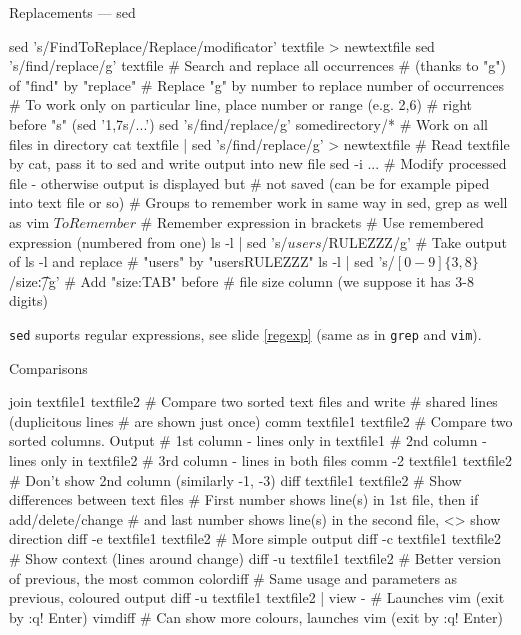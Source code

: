 \documentclass[hyperref={bookmarks=true, unicode=true, colorlinks=true, pdftitle={Linux, command line and MetaCentrum}, plainpages=false, pdfauthor={Vojtech Zeisek}, pdfsubject={Course about use of Linux command line, writing shell scripts and using MetaCentrum of CESNET}, pdfcreator={XeLaTeX, http://www.xelatex.org/}, pdfkeywords={Linux, GNU, BASH, shell, command line, MetaCentrum}, linkcolor=Sienna, anchorcolor=black, citecolor=green, filecolor=magenta, menucolor=Sienna, urlcolor=cyan, pdftex}, compress, ucs, xelatex, xcolor=svgnames, 11pt]{beamer}
\begin{document}
\begin{frame}[fragile]{Replacements --- sed}
  \begin{bashcode}
    sed 's/FindToReplace/Replace/modificator' textfile > newtextfile
    sed 's/find/replace/g' textfile # Search and replace all occurrences
                                    # (thanks to "g") of "find" by "replace"
    # Replace "g" by number to replace number of occurrences
    # To work only on particular line, place number or range (e.g. 2,6)
    # right before "s" (sed '1,7s/...')
    sed 's/find/replace/g' somedirectory/* # Work on all files in directory
    cat textfile | sed 's/find/replace/g' > newtextfile
      # Read textfile by cat, pass it to sed and write output into new file
    sed -i ... # Modify processed file - otherwise output is displayed but
               # not saved (can be for example piped into text file or so)
    # Groups to remember work in same way in sed, grep as well as vim
    \(ToRemember\) # Remember expression in brackets
    \Number # Use remembered expression (numbered from one)
    ls -l | sed 's/\(users\)/\1RULEZZZ/g' # Take output of ls -l and replace
                                          # "users" by "usersRULEZZZ"
    ls -l | sed 's/\([0-9]\{3,8\}\)/size:\t\1/g' # Add "size:TAB" before
                       # file size column (we suppose it has 3-8 digits)
  \end{bashcode}
\texttt{sed} suports regular expressions, see slide \ref{regexp} (same as in \texttt{grep} and \texttt{vim}).
\end{frame}

\begin{frame}[fragile]{Comparisons}
  \begin{bashcode}
    join textfile1 textfile2 # Compare two sorted text files and write
                             # shared lines (duplicitous lines 
                             # are shown just once)
    comm textfile1 textfile2 # Compare two sorted columns. Output
      # 1st column - lines only in textfile1
      # 2nd column - lines only in textfile2
      # 3rd column - lines in both files
    comm -2 textfile1 textfile2 # Don't show 2nd column (similarly -1, -3)
    diff textfile1 textfile2 # Show differences between text files
      # First number shows line(s) in 1st file, then if add/delete/change
      # and last number shows line(s) in the second file, <> show direction
    diff -e textfile1 textfile2 # More simple output
    diff -c textfile1 textfile2 # Show context (lines around change)
    diff -u textfile1 textfile2 # Better version of previous, the most common
    colordiff # Same usage and parameters as previous, coloured output
    diff -u textfile1 textfile2 | view - # Launches vim (exit by :q! Enter)
    vimdiff # Can show more colours, launches vim (exit by :q! Enter)
  \end{bashcode}
\end{frame}
\end{document}
